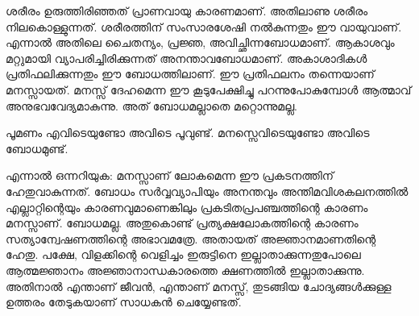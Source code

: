 ശരീരം ഉരുത്തിരിഞ്ഞത് പ്രാണവായു കാരണമാണ്. അതിലാണു ശരീരം നിലകൊള്ളുന്നത്. ശരീരത്തിന് സംസാരശേഷി നല്‍കുന്നതും ഈ വായുവാണ്. എന്നാല്‍ അതിലെ ചൈതന്യം, പ്രജ്ഞ, അവിച്ഛിന്നബോധമാണ്. ആകാശവും മറ്റുമായി വ്യാപരിച്ചിരിക്കുന്നത് അനന്താവബോധമാണ്. അകാശാദികള്‍ പ്രതിഫലിക്കുന്നതും ഈ ബോധത്തിലാണ്. ഈ പ്രതിഫലനം തന്നെയാണ് മനസ്സായത്. മനസ്സ് ദേഹമെന്ന ഈ കൂടുപേക്ഷിച്ചു പറന്നുപോകുമ്പോള്‍ ആത്മാവ് അനുഭവവേദ്യമാകുന്നു.  അത് ബോധമല്ലാതെ മറ്റൊന്നുമല്ല.

പൂമണം എവിടെയുണ്ടോ അവിടെ പൂവുണ്ട്. മനസ്സെവിടെയുണ്ടോ അവിടെ ബോധമുണ്ട്.

എന്നാല്‍ ഒന്നറിയുക: മനസ്സാണ് ലോകമെന്ന ഈ പ്രകടനത്തിന് ഹേതുവാകുന്നത്. ബോധം സര്‍വ്വവ്യാപിയും അനന്തവും അന്തിമവിശകലനത്തില്‍ എല്ലാറ്റിന്റെയും കാരണവുമാണെങ്കിലും പ്രകടിതപ്രപഞ്ചത്തിന്റെ കാരണം മനസ്സാണ്. ബോധമല്ല. അതുകൊണ്ട് പ്രത്യക്ഷലോകത്തിന്റെ കാരണം സത്യാന്വേഷണത്തിന്റെ അഭാവമത്രേ. അതായത് അജ്ഞാനമാണതിന്റെ ഹേതു. പക്ഷേ, വിളക്കിന്റെ വെളിച്ചം ഇരുട്ടിനെ ഇല്ലാതാക്കുന്നതുപോലെ ആത്മജ്ഞാനം അജ്ഞാനാന്ധകാരത്തെ ക്ഷണത്തില്‍ ഇല്ലാതാക്കുന്നു. അതിനാല്‍ എന്താണ് ജീവന്‍, എന്താണ് മനസ്സ്, തുടങ്ങിയ ചോദ്യങ്ങള്‍ക്കുള്ള ഉത്തരം തേടുകയാണ് സാധകന്‍ ചെയ്യേണ്ടത്.

